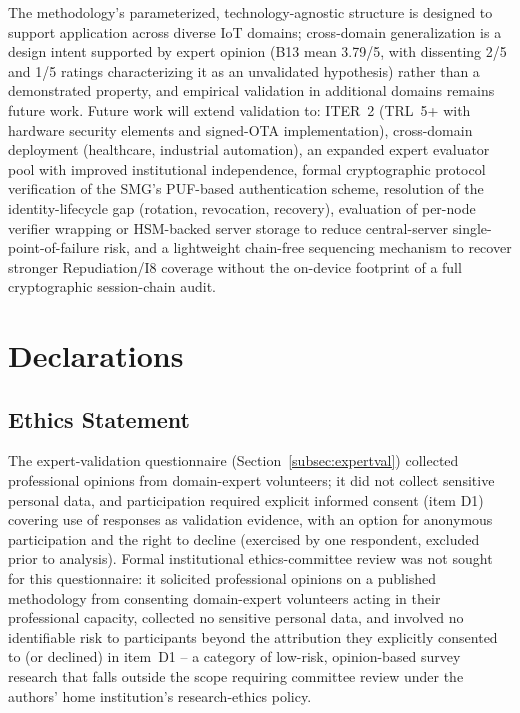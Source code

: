 \documentclass[preprint,12pt,authoryear]{elsarticle}
\begin{document}
The methodology's parameterized, technology-agnostic structure is designed to support application across diverse IoT domains; cross-domain generalization is a design intent supported by expert opinion (B13 mean 3.79/5, with dissenting 2/5 and 1/5 ratings characterizing it as an unvalidated hypothesis) rather than a demonstrated property, and empirical validation in additional domains remains future work. Future work will extend validation to: ITER~2 (TRL~5+ with hardware security elements and signed-OTA implementation), cross-domain deployment (healthcare, industrial automation), an expanded expert evaluator pool with improved institutional independence, formal cryptographic protocol verification of the SMG's PUF-based authentication scheme, resolution of the identity-lifecycle gap (rotation, revocation, recovery), evaluation of per-node verifier wrapping or HSM-backed server storage to reduce central-server single-point-of-failure risk, and a lightweight chain-free sequencing mechanism to recover stronger Repudiation/I8 coverage without the on-device footprint of a full cryptographic session-chain audit.



\section*{Declarations}

\subsection*{Ethics Statement}
The expert-validation questionnaire (Section~\ref{subsec:expertval}) collected professional opinions from domain-expert volunteers; it did not collect sensitive personal data, and participation required explicit informed consent (item D1) covering use of responses as validation evidence, with an option for anonymous participation and the right to decline (exercised by one respondent, excluded prior to analysis). Formal institutional ethics-committee review was not sought for this questionnaire: it solicited professional opinions on a published methodology from consenting domain-expert volunteers acting in their professional capacity, collected no sensitive personal data, and involved no identifiable risk to participants beyond the attribution they explicitly consented to (or declined) in item~D1 -- a category of low-risk, opinion-based survey research that falls outside the scope requiring committee review under the authors' home institution's research-ethics policy.
\end{document}
